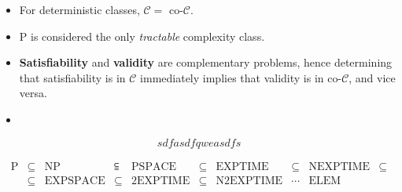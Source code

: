 \documentclass[a4paper,12pt,landscape]{article}
\begin{document}
\begin{itemize}
    \item 
    For deterministic classes, $\mathcal{C} = $ co-$\mathcal{C}$.

    \item $\mathrm{P}$ is considered the only \textit{tractable} complexity class.

    \item \textbf{Satisfiability} and \textbf{validity} are complementary problems, 
    hence determining that satisfiability is in $\mathcal{C}$ immediately implies that validity is in co-$\mathcal{C}$,  
    and vice versa.

    \item 
\end{itemize}


\[
    sdfasdfqweasdfs
\]


\[\begin{array}{ccccccccccccc}
    \mathrm{P} & \subseteq & \mathrm{NP} & \subseteqq & \mathrm{PSPACE} & \subseteq & \mathrm{EXPTIME} & \subseteq & \mathrm{NEXPTIME} & \subseteq \\   

    &  \subseteq & \mathrm{EXPSPACE} & \subseteq & \mathrm{2EXPTIME} & \subseteq & \mathrm{N2EXPTIME} & \cdots & \mathrm{ELEM} \\
\end{array}\]



\begin{figure}[ht!]
    \centering
\end{figure}


\vspace{1.5em}
\end{document}
